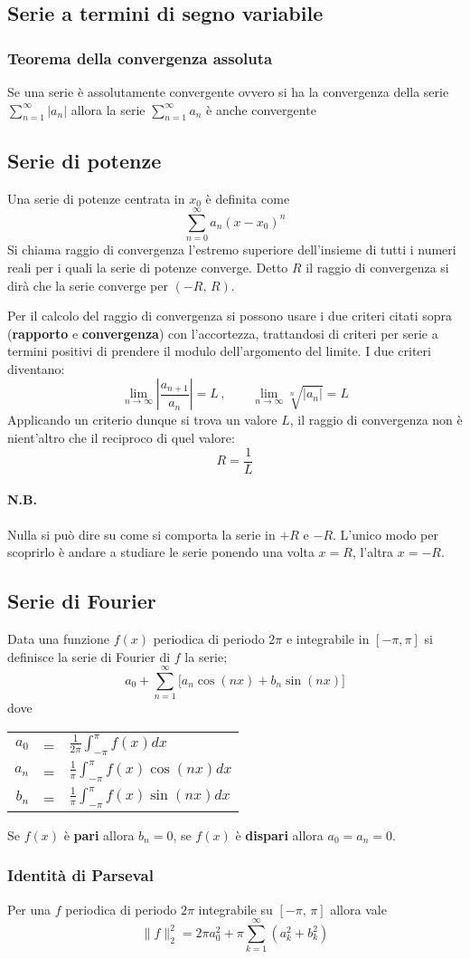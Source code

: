 \documentclass[10pt,a4paper]{report}
\begin{document}
\subsection*{Serie a termini di segno variabile}
                
\subsubsection{Teorema della convergenza assoluta}
Se una serie è assolutamente convergente ovvero si ha la convergenza della serie $ \sum_{n=1}^{\infty} |a_{n}| $ allora la serie $ \sum_{n=1}^{\infty} a_{n} $ è anche convergente

\subsection*{Serie di potenze}
Una serie di potenze centrata in $x_0$ è definita come
\[\sum_{n=0}^\infty a_n (x-x_0)^n\]
Si chiama raggio di convergenza l'estremo superiore dell'insieme di tutti i numeri reali per i quali la serie di potenze converge. Detto $R$ il raggio di convergenza si dirà che la serie converge per $(-R,\,R)$. \medskip

Per il calcolo del raggio di convergenza si possono usare i due criteri citati sopra (\textbf{rapporto} e \textbf{convergenza}) con l'accortezza, trattandosi di criteri per serie a termini positivi di prendere il modulo dell'argomento del limite. I due criteri diventano:
\[
\lim_{n \to \infty} \left\lvert\frac{a_{n+1}}{a_{n}}\right\rvert = L\,,\qquad
\lim_{n \to \infty} \sqrt[n]{\lvert a_{n}\rvert} = L
 \]
Applicando un criterio dunque si trova un valore $L$, il raggio di convergenza non è nient'altro che il reciproco di quel valore:
\[R=\frac{1}{L}\]
\paragraph{N.B.} Nulla si può dire su come si comporta la serie in $+R$ e $-R$. L'unico modo per scoprirlo è andare a studiare le serie ponendo una volta $x=R$, l'altra $x=-R$.

\subsection*{Serie di Fourier}
Data una funzione $f(x)$ periodica di periodo $2\pi $ e integrabile in $[-\pi,\pi]$ si definisce la serie di Fourier di $f$ la serie;
\[ a_0+ \sum_{n=1}^\infty \Big[ a_n \cos(nx) + b_n \sin(nx)\Big]\]
dove
\begin{center}
{\renewcommand*{\arraystretch}{3}
\begin{tabular}{r c l}
    $a_0$ & = & {$\displaystyle \frac{1}{2\pi}\int_{-\pi}^\pi f(x)dx$}\\
    $a_n$ & = & {$\displaystyle \frac{1}{\pi}\int_{-\pi}^\pi f(x)\cos(nx)dx$}\\
    $b_n$ & = & {$\displaystyle \frac{1}{\pi}\int_{-\pi}^\pi f(x)\sin(nx)dx$}\\
\end{tabular}
}
\end{center}
Se $f(x)$ è \textbf{pari} allora $b_n=0$, se $f(x)$ è \textbf{dispari} allora $a_0=a_n=0$.
\subsubsection*{Identità di Parseval}
Per una $f$ periodica di periodo $2\pi$ integrabile su $[-\pi,\,\pi]$ allora vale
\[\lVert f\rVert _2^2 = 2\pi a_0^2 + \pi\sum_{k=1}^\infty (a_k^2+b_k^2)\]
\end{document}
